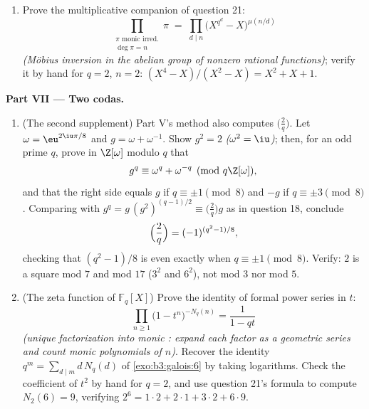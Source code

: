 \begin{problem}
\begin{enumerate}[resume]
        the prime number theorem, with $\log x$ traded for $n$;
        verify numerically for $q = 2$, $n \leq 4$
        (\cref{exo:b3:galois:6} lists the counts).
  \item Prove the multiplicative companion of question 21:
        \[
        \prod_{\substack{\pi \text{ monic irred.}\\ \deg\pi =
        n}}\pi \;=\; \prod_{d \mid n}
        \bigl(X^{q^d} - X\bigr)^{\mu(n/d)}
        \]
        \emph{(M\"obius inversion in the abelian group of
        nonzero rational functions)}; verify it by hand for $q
        = 2$, $n = 2$: $(X^4 - X)/(X^2 - X) = X^2 + X + 1$.
\end{enumerate}

\medskip
\noindent\textbf{Part VII --- Two codas.}
\begin{enumerate}[resume]
  \item (The second supplement) Part V's method also computes
        $\bigl(\frac2q\bigr)$. Let $\omega = \eu^{2\iu\pi/8}$
        and $g = \omega + \omega^{-1}$. Show $g^2 = 2$
        \emph{($\omega^2 = \iu$)}; then, for an odd prime $q$,
        prove in $\Z[\omega]$ modulo $q$ that
        \[
        g^q \equiv \omega^q + \omega^{-q} \pmod{q\Z[\omega]},
        \]
        and that the right side equals $g$ if $q \equiv \pm1
        \pmod 8$ and $-g$ if $q \equiv \pm3 \pmod 8$. Comparing
        with $g^q = g\,(g^2)^{(q-1)/2} \equiv
        \bigl(\frac2q\bigr)g$ as in question 18, conclude
        \[
        \Bigl(\frac2q\Bigr) = (-1)^{(q^2-1)/8},
        \]
        checking that $(q^2 - 1)/8$ is even exactly when $q
        \equiv \pm1 \pmod 8$. Verify: $2$ is a square mod $7$
        and mod $17$ ($3^2$ and $6^2$), not mod $3$ nor mod
        $5$.
  \item (The zeta function of $\mathbb F_q[X]$) Prove the
        identity of formal power series in $t$:
        \[
        \prod_{n \geq 1}\bigl(1 - t^n\bigr)^{-N_q(n)}
        = \frac1{1 - qt}
        \]
        \emph{(unique factorization into monic :
        expand each factor as a geometric series and count
        monic polynomials of  $n$)}. Recover the identity
        $q^m = \sum_{d \mid m}d\,N_q(d)$ of
        \cref{exo:b3:galois:6} by taking logarithms. Check the
        coefficient of $t^2$ by hand for $q = 2$, and use
        question 21's formula to compute $N_2(6) = 9$,
        verifying $2^6 = 1\cdot2 + 2\cdot1 + 3\cdot2 +
        6\cdot9$.
\end{enumerate}
\end{problem}
